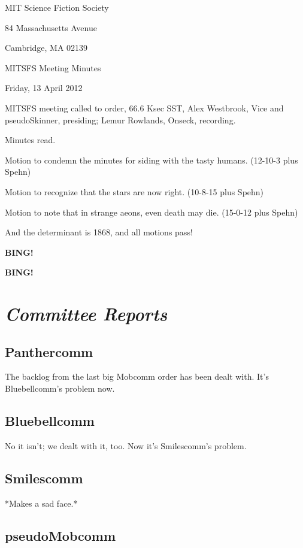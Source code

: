 \documentclass[10pt]{article}
\newcommand{\bing}{{\bf BING!} }
\newcommand{\goto}[1]{\bing \vskip 12pt \section*{{\em{#1}}}}
\newcommand{\ps}{ plus Spehn\xspace}
\newcommand{\skinner}{Alex Westbrook, Vice and pseudoSkinner}
\newcommand{\onseck}{Lemur Rowlands, Onseck}
\newcommand{\meetingdate}{Friday, 13 April 2012}
\begin{document}
\begin{center}

MIT Science Fiction Society

84 Massachusetts Avenue

Cambridge, MA 02139

\vspace{12pt}

MITSFS Meeting Minutes

\meetingdate

\end{center}

\vspace{18pt}

\setlength{\parskip}{6pt}

\noindent
MITSFS meeting called to order, 66.6 Ksec SST,
\skinner, presiding; \onseck, recording.

Minutes read.

Motion to condemn the minutes for siding with the tasty humans. (12-10-3\ps)

Motion to recognize that the stars are now right. (10-8-15\ps)

Motion to note that in strange aeons, even death may die. (15-0-12\ps)

And the determinant is 1868, and all motions pass!

\bing


\goto{Committee Reports}

\subsection*{Panthercomm}

The backlog from the last big Mobcomm order has been dealt with.
It's Bluebellcomm's problem now.


\subsection*{Bluebellcomm}

No it isn't; we dealt with it, too.  Now it's Smilescomm's problem.


\subsection*{Smilescomm}

*Makes a sad face.*


\subsection*{pseudoMobcomm}
\end{document}
